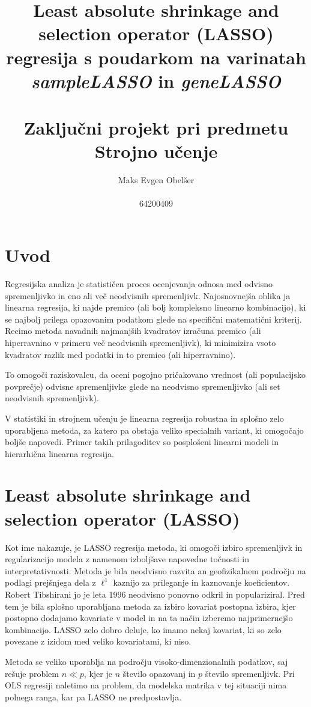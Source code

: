 \documentclass[onecolumn]{report}
\title{%
	Least absolute shrinkage and selection operator (LASSO) regresija s poudarkom na varinatah \emph{sampleLASSO} in \emph{geneLASSO} \\
	\ \\
	\large Zaključni projekt pri predmetu Strojno učenje}
\author{
	Maks Evgen Obelšer \\ 
	\ \\ 
	\large 64200409
}
\begin{document}
\maketitle

\section{Uvod}

Regresijska analiza je statističen proces ocenjevanja odnosa med odvisno spremenljivko in eno ali več neodvisnih spremenljivk. Najosnovnejša oblika ja linearna regresija, ki najde premico (ali bolj kompleksno linearno kombinacijo), ki se najbolj prilega opazovanim podatkom glede na specifični matematični kriterij. Recimo metoda navadnih najmanjših kvadratov izračuna premico (ali hiperravnino v primeru več neodvisnih spremenljivk), ki minimizira vsoto kvadratov razlik med podatki in to premico (ali hiperravnino). 

To omogoči raziskovalcu, da oceni pogojno pričakovano vrednost (ali populacijsko povprečje) odvisne spremenljivke glede na neodvisno spremenljivko (ali set neodvisnih spremenljivk). 

V statistiki in strojnem učenju je linearna regresija robustna in splošno zelo uporabljena metoda, za katero pa obstaja veliko specialnih variant, ki omogočajo boljše napovedi. Primer takih prilagoditev so posplošeni linearni modeli in hierarhična linearna regresija. 

\section{Least absolute shrinkage and selection operator (LASSO)}

Kot ime nakazuje, je LASSO regresija metoda, ki omogoči izbiro spremenljivk in regularizacijo modela z namenom izboljšave napovedne točnosti in interpretativnosti. Metoda je bila neodvisno razvita an geofizikalnem področju na podlagi prejšnjega dela z $\ell^1$ kaznijo za prileganje in kaznovanje koeficientov. Robert Tibshirani jo je leta 1996 neodvisno ponovno odkril in populariziral. Pred tem je bila splošno uporabljana metoda za izbiro kovariat postopna izbira, kjer postopno dodajamo kovariate v model in na ta način izberemo najprimernejšo kombinacijo. LASSO zelo dobro deluje, ko imamo nekaj kovariat, ki so zelo povezane z izidom med veliko kovariatami, ki niso. 

Metoda se veliko uporablja na področju visoko-dimenzionalnih podatkov, saj rešuje problem $n \ll p$, kjer je $n$ število opazovanj in $p$ število spremenljivk. Pri OLS regresiji naletimo na problem, da modelska matrika v tej situaciji nima polnega ranga, kar pa LASSO ne predpostavlja.
\end{document}
